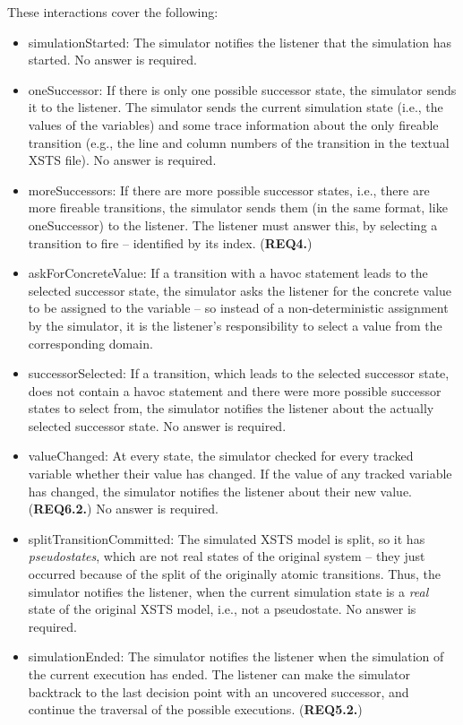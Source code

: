 These interactions cover the following:
\begin{itemize}
    \item \textsf{simulationStarted}: The simulator notifies the listener that the simulation has started. No answer is required.
    \item \textsf{oneSuccessor}: If there is only one possible successor state, the simulator sends it to the listener. The simulator sends the current simulation state (i.e., the values of the variables) and some trace information about the only fireable transition (e.g., the line and column numbers of the transition in the textual XSTS file). No answer is required.
    \item \textsf{moreSuccessors}: If there are more possible successor states, i.e., there are more fireable transitions, the simulator sends them (in the same format, like \textsf{oneSuccessor}) to the listener. The listener must answer this, by selecting a transition to fire -- identified by its index. (\textbf{REQ4.})
    \item \textsf{askForConcreteValue}: If a transition with a havoc statement leads to the selected successor state, the simulator asks the listener for the concrete value to be assigned to the variable -- so instead of a non-deterministic assignment by the simulator, it is the listener's responsibility to select a value from the corresponding domain.
    \item \textsf{successorSelected}: If a transition, which leads to the selected successor state, does not contain a havoc statement and there were more possible successor states to select from, the simulator notifies the listener about the actually selected successor state. No answer is required.
    \item \textsf{valueChanged}: At every state, the simulator checked for every tracked variable whether their value has changed. If the value of any tracked variable has changed, the simulator notifies the listener about their new value. (\textbf{REQ6.2.}) No answer is required.
    \item \textsf{splitTransitionCommitted}: The simulated XSTS model is split, so it has \textit{pseudostates}, which are not real states of the original system -- they just occurred because of the split of the originally atomic transitions. Thus, the simulator notifies the listener, when the current simulation state is a \textit{real} state of the original XSTS model, i.e., not a pseudostate. No answer is required.
    \item \textsf{simulationEnded}: The simulator notifies the listener when the simulation of the current execution has ended. The listener can make the simulator backtrack to the last decision point with an uncovered successor, and continue the traversal of the possible executions. (\textbf{REQ5.2.})
\end{itemize}

